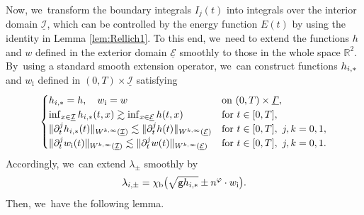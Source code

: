 \documentclass[11pt]{article}
\newcommand{\gr}{{\mathtt g}}
\newcommand{\R}{{\mathbb R}}
\newcommand{\dt}{\partial_t}
\newcommand{\cI}{{\mathcal I}}
\newcommand{\cE}{{\mathcal E}}
\newcommand{\ul}[1]{\underline{#1}}
\newcommand{\itGamma}{\mathit{\Gamma}}
\theoremstyle{definition}
\begin{document}
Now, we~transform the boundary integrals $I_j(t)$ into integrals over the interior domain $\ul{\cI}$, which can be controlled by the energy function $E(t)$
by using the identity in Lemma \ref{lem:Rellich1}.
To this end, we~need to extend the functions $h$ and $w$ defined in the exterior domain $\ul{\cE}$ smoothly to those in the whole space $\R^2$. By~using a standard smooth extension operator, we~can construct functions $h_{{\rm i},*}$ and $w_\mathrm{i}$ defined in $(0,T)\times\ul{\cI}$ satisfying
\begin{equation}\label{Ext2}
\begin{cases}
h_{{\rm i},*}=h, \quad w_\mathrm{i}=w &\text{on } (0,T)\times\ul{\itGamma}, \\
\inf_{x\in\ul{\cI}}h_{{\rm i},*}(t,x) \gtrsim \inf_{x\in\ul{\cE}}h(t,x) &\text{for } t\in[0,T], \\
\|\dt^jh_{{\rm i},*}(t)\|_{W^{k,\infty}(\ul{\cI})} \lesssim \|\dt^jh(t)\|_{W^{k,\infty}(\ul{\cE})} &\text{for } t\in[0,T], \ j,k=0,1, \\
\|\dt^jw_\mathrm{i}(t)\|_{W^{k,\infty}(\ul{\cI})} \lesssim \|\dt^jw(t)\|_{W^{k,\infty}(\ul{\cE})} &\text{for } t\in[0,T], \ j,k=0,1.
\end{cases}
\end{equation}
Accordingly, we~can extend $\lambda_{\pm}$ smoothly by
\[
\lambda_{{\rm i},\pm} = \chi_\mathrm{b} \bigl(\sqrt{\gr h_{{\rm i},*}}\pm n^\varphi\cdot w_\mathrm{i} \bigr).
\]
Then, we~have the following lemma.
\end{document}
